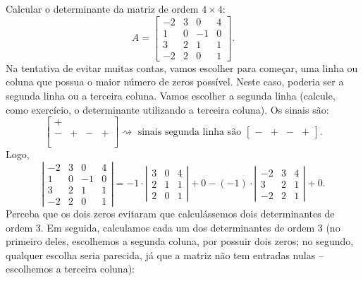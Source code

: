 \begin{ex}\label{exp:det1}
	Calcular o determinante da matriz de ordem $4 \times 4$:
	\begin{equation}
	A =
	\begin{bmatrix}
    -2 & 3 & 0  & 4 \\
    1  & 0 & -1 & 0 \\
    3  & 2 & 1  & 1 \\
    -2 & 2 & 0  & 1
	\end{bmatrix}.
	\end{equation} Na tentativa de evitar muitas contas, vamos escolher para começar, uma linha ou coluna que possua o maior número de zeros possível. Neste caso, poderia ser a segunda linha ou a terceira coluna. Vamos escolher a segunda linha (calcule, como exercício, o determinante utilizando a terceira coluna). Os sinais são:
	\begin{equation}
	\begin{bmatrix}
	+ &  &  &  \\
	- &  + & - & + \\
	 &     &   & \\
	 &     &   &
	\end{bmatrix}\rightsquigarrow \text{ sinais segunda linha são }
	\begin{bmatrix}
	- & + & - & +
	\end{bmatrix}.
	\end{equation} Logo,
	\begin{equation}
	\left| \begin{matrix}
	-2 & 3 & 0  & 4 \\
	1  & 0 & -1 & 0 \\
	3  & 2 & 1  & 1 \\
	-2 & 2 & 0  & 1
	\end{matrix}\right| = -1 \cdot
	\left| \begin{matrix}
	 3 & 0  & 4 \\
	 2 & 1  & 1 \\
	 2 & 0  & 1
	\end{matrix}\right| + 0 - (-1) \cdot
	\left| \begin{matrix}
	-2 & 3 &  4 \\
	3  & 2 &  1 \\
	-2 & 2 &  1
	\end{matrix}\right| + 0.
	\end{equation} Perceba que os dois zeros evitaram que calculássemos dois determinantes de ordem 3. Em seguida, calculamos cada um dos determinantes de ordem 3 (no primeiro deles, escolhemos a segunda coluna, por possuir dois zeros; no segundo, qualquer escolha seria parecida, já que a matriz não tem entradas nulas -- escolhemos a terceira coluna):

\end{ex}
